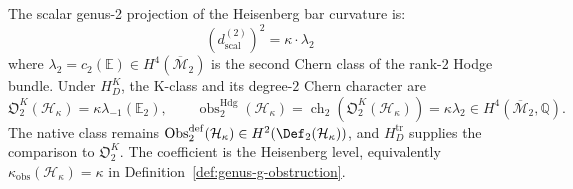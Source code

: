 \begin{theorem}\label{thm:heisenberg-genus2-obstruction}
The scalar genus-2 projection of the Heisenberg bar curvature is:
\begin{equation}\label{eq:heisenberg-genus2-curvature}
(d^{(2)}_{\mathrm{scal}})^2 = \kappa \cdot \lambda_2
\end{equation}
where $\lambda_2 = c_2(\mathbb{E}) \in
H^4(\overline{\mathcal{M}}_2)$ is the second Chern class of the
rank-$2$ Hodge bundle. Under $H_D^K$, the K-class and its degree-$2$
Chern character are
\begin{equation}
\mathfrak O_2^K(\mathcal{H}_\kappa)
=\kappa\lambda_{-1}(\mathbb E_2),
\qquad
\operatorname{obs}^{\mathrm{Hdg}}_2(\mathcal{H}_\kappa)
=\operatorname{ch}_2(\mathfrak O_2^K(\mathcal{H}_\kappa))
=\kappa\lambda_2
\in H^4\!\left(\overline{\mathcal{M}}_2,\mathbb Q\right).
\end{equation}
The native class remains
$\operatorname{Obs}^{\mathrm{def}}_2(\mathcal H_\kappa)
\in H^2(\Def_2(\mathcal H_\kappa))$, and $H_D^{\mathrm{tr}}$ supplies
the comparison to $\mathfrak O_2^K$.  The coefficient is the
Heisenberg level, equivalently
$\kappa_{\mathrm{obs}}(\mathcal{H}_\kappa)=\kappa$ in
Definition~\ref{def:genus-g-obstruction}.
\end{theorem}

